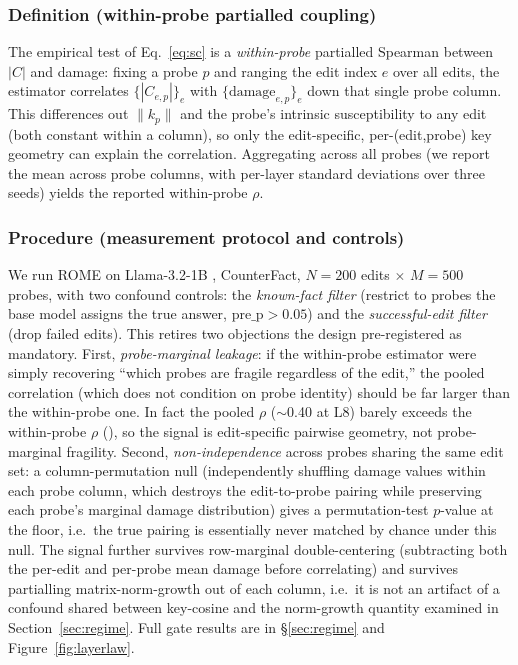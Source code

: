 \subsubsection{Definition (within-probe partialled coupling)}
The empirical test of Eq.~\ref{eq:sc} is a \emph{within-probe} partialled
Spearman between $|C|$ and damage: fixing a probe $p$ and ranging the edit
index $e$ over all edits, the estimator correlates $\{|C_{e,p}|\}_e$ with
$\{\text{damage}_{e,p}\}_e$ down that single probe column. This differences out
$\|k_p\|$ and the probe's intrinsic susceptibility to any edit (both constant
within a column), so only the edit-specific, per-(edit,probe) key geometry can
explain the correlation. Aggregating across all probes (we report the mean
across probe columns, with per-layer standard deviations over three seeds)
yields the reported within-probe $\rho$.

\subsubsection{Procedure (measurement protocol and controls)}
We run ROME on Llama-3.2-1B \citep{grattafiori2024llama3},
CounterFact, $N{=}200$ edits
$\times$ $M{=}500$ probes, with two confound controls: the \emph{known-fact
filter} (restrict to probes the base model assigns the true answer,
$\text{pre\_p}>0.05$) and the \emph{successful-edit filter} (drop failed edits).
This retires two objections the design pre-registered as
mandatory. First, \emph{probe-marginal leakage}: if the within-probe estimator
were simply recovering ``which probes are fragile regardless of the edit,''
the pooled correlation (which does not condition on probe identity) should be
far larger than the within-probe one. In fact the pooled $\rho$ ($\sim$0.40 at
L8) barely exceeds the within-probe $\rho$ (\gWithinLeight{}), so the signal
is edit-specific pairwise geometry, not probe-marginal fragility. Second,
\emph{non-independence} across probes sharing the same edit set: a
column-permutation null (independently shuffling damage values within each
probe column, which destroys the edit-to-probe pairing while preserving each
probe's marginal damage distribution) gives a permutation-test $p$-value at
the \gPermFloor{} floor, i.e.\ the true pairing is essentially never matched
by chance under this null. The signal further survives row-marginal
double-centering (subtracting both the per-edit and per-probe mean damage
before correlating) and survives partialling matrix-norm-growth out of each
column, i.e.\ it is not an artifact of a confound shared between key-cosine
and the norm-growth quantity examined in Section~\ref{sec:regime}. Full gate
results are in \S\ref{sec:regime} and Figure~\ref{fig:layerlaw}.
